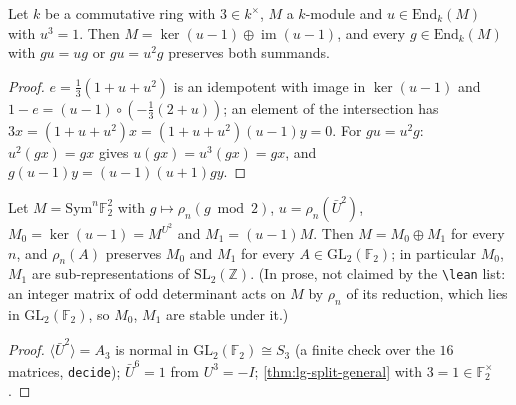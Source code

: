 \begin{theorem}\label{thm:lg-split-general}
  \leanok
  Let $k$ be a commutative ring with $3\in k^\times$, $M$ a $k$-module and $u\in\mathrm{End}_k(M)$ with $u^3=1$.  Then
  $M=\ker(u-1)\oplus\operatorname{im}(u-1)$, and every $g\in\mathrm{End}_k(M)$ with $gu=ug$ or $gu=u^2g$ preserves both summands.
\end{theorem}
\begin{proof}
  \leanok
  $e=\tfrac13(1+u+u^2)$ is an idempotent with image in $\ker(u-1)$ and $1-e=(u-1)\circ(-\tfrac13(2+u))$; an element of the
  intersection has $3x=(1+u+u^2)x=(1+u+u^2)(u-1)y=0$.  For $gu=u^2g$: $u^2(gx)=gx$ gives $u(gx)=u^3(gx)=gx$, and
  $g(u-1)y=(u-1)(u+1)gy$.
\end{proof}

\begin{theorem}[$\mathrm{Sym}^n\mathbb F_2^2=M_0\oplus M_1$, stable under $\mathrm{GL}_2(\mathbb F_2)$]\label{thm:lg-split-v2}
  \leanok
  Let $M=\mathrm{Sym}^n\mathbb F_2^2$ with $g\mapsto\rho_n(g\bmod2)$, $u=\rho_n(\bar U^2)$, $M_0=\ker(u-1)=M^{U^2}$ and $M_1=(u-1)M$.  Then
  $M=M_0\oplus M_1$ for every $n$, and $\rho_n(A)$ preserves $M_0$ and $M_1$ for every $A\in\mathrm{GL}_2(\mathbb F_2)$; in particular
  $M_0$, $M_1$ are sub-representations of $\mathrm{SL}_2(\mathbb Z)$.  (In prose, not claimed by the \texttt{\textbackslash lean} list: an integer
  matrix of odd determinant acts on $M$ by $\rho_n$ of its reduction, which lies in $\mathrm{GL}_2(\mathbb F_2)$, so $M_0$, $M_1$ are
  stable under it.)
\end{theorem}
\begin{proof}
  \leanok
  $\langle\bar U^2\rangle=A_3$ is normal in $\mathrm{GL}_2(\mathbb F_2)\cong S_3$ (a finite check over the $16$ matrices,
  \texttt{decide}); $\bar U^6=1$ from $U^3=-I$; \ref{thm:lg-split-general} with $3=1\in\mathbb F_2^\times$.
\end{proof}

